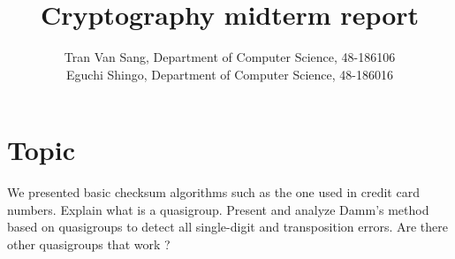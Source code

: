 \documentclass[10pt]{report}
\begin{document}
\title{Cryptography midterm report}
\author{Tran Van Sang, Department of Computer Science, 48-186106\\
Eguchi Shingo, Department of Computer Science, 48-186016}
\maketitle
\tableofcontents

\chapter{Topic}
We presented basic checksum algorithms such as the one used in credit card numbers. Explain what is a quasigroup. Present and analyze Damm’s method based on quasigroups to detect all single-digit and transposition errors. Are there other quasigroups that work ?







\end{document}
